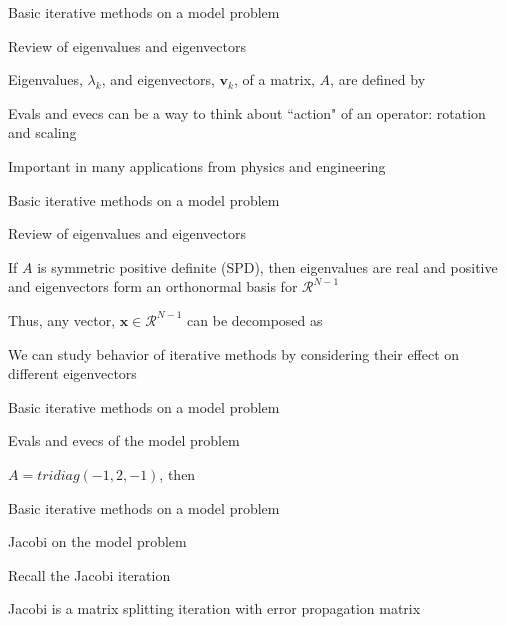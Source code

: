\documentclass[18pt,xcolor=table]{beamer}
\begin{document}
\begin{frame}{Basic iterative methods on a model problem}
\begin{block}{Review of eigenvalues and eigenvectors}
\bit
\item Eigenvalues, $\lambda_k$, and eigenvectors, $\mathbf{v}_k$, of a matrix, $A$, are defined by
\item Evals and evecs can be a way to think about ``action" of an operator: rotation and scaling
\item Important in many applications from physics and engineering
\eit
\end{block}
\end{frame}

\begin{frame}{Basic iterative methods on a model problem}
\begin{block}{Review of eigenvalues and eigenvectors}
\bit
\item If $A$ is symmetric positive definite (SPD), then eigenvalues are real and positive and eigenvectors form an orthonormal basis for $\mathcal{R}^{N-1}$
\item Thus, any vector, $\mathbf{x}\in\mathcal{R}^{N-1}$ can be decomposed as 
\item We can study behavior of iterative methods by considering their effect on different eigenvectors
\eit
\end{block}
\end{frame}

\begin{frame}{Basic iterative methods on a model problem}
\begin{block}{Evals and evecs of the model problem}
\bit
\item $A = tridiag(-1,2,-1)$, then
\eit
\end{block}
\end{frame}

\begin{frame}{Basic iterative methods on a model problem}
\begin{block}{Jacobi on the model problem}
\bit
\item Recall the Jacobi iteration
\item Jacobi is a matrix splitting iteration with error propagation matrix
\eit
\end{block}
\end{frame}
\end{document}
